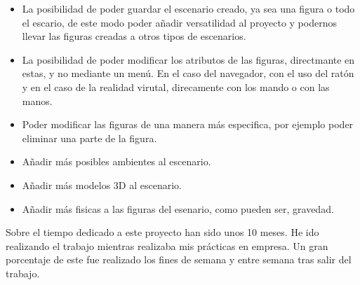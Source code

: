 \documentclass[a4paper, 12pt]{book}
\begin{document}
\begin{itemize}
    \item La posibilidad de poder guardar el escenario creado, ya sea una figura o todo el escario, de este modo poder añadir versatilidad al proyecto y podernos llevar las figuras creadas a otros tipos de escenarios.
    \item La posibilidad de poder modificar los atributos de las figuras, directmante en estas, y no mediante un menú. En el caso del navegador, con el uso del ratón y en el caso de la realidad virutal, direcamente con los mando o con las manos.
    \item Poder modificar las figuras de una manera más especifica, por ejemplo poder eliminar una parte de la figura.
    \item Añadir más posibles ambientes al escenario.
    \item Añadir más modelos 3D al escenario.
    \item Añadir más fisicas a las figuras del esenario, como pueden ser, gravedad.
\end{itemize}

Sobre el tiempo dedicado a este proyecto han sido unos 10 meses. He ido realizando el trabajo mientras realizaba mis prácticas en empresa. Un gran porcentaje de este fue realizado los fines de semana y entre semana tras salir del trabajo.

\cleardoublepage


\end{document}
